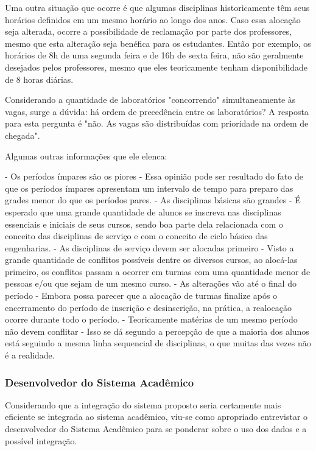         Uma outra situação que ocorre é que algumas disciplinas historicamente têm seus horários definidos em um mesmo horário ao longo dos anos. Caso essa alocação seja alterada, ocorre a possibilidade de reclamação por parte dos professores, mesmo que esta alteração seja benéfica para os estudantes. Então por exemplo, os horários de 8h de uma segunda feira e de 16h de sexta feira, não são geralmente desejados pelos professores, mesmo que eles teoricamente tenham disponibilidade de 8 horas diárias.

        Considerando a quantidade de laboratórios "concorrendo" simultaneamente às vagas, surge a dúvida: há ordem de precedência entre os laboratórios? A resposta para esta pergunta é "não. As vagas são distribuídas com prioridade na ordem de chegada".

        Algumas outras informações que ele elenca:

        - Os períodos ímpares são os piores
        - Essa opinião pode ser resultado do fato de que os períodos ímpares apresentam um intervalo de tempo para preparo das grades menor do que os períodos pares.
        - As disciplinas básicas são grandes
        - É esperado que uma grande quantidade de alunos se inscreva nas disciplinas essenciais e iniciais de seus cursos, sendo boa parte dela relacionada com o conceito das disciplinas de serviço e com o conceito de ciclo básico das engenharias.
        - As disciplinas de serviço devem ser alocadas primeiro
        - Visto a grande quantidade de conflitos possíveis dentre os diversos cursos, ao alocá-las primeiro, os conflitos passam a ocorrer em turmas com uma quantidade menor de pessoas e/ou que sejam de um mesmo curso.
        - As alterações vão até o final do período
        - Embora possa parecer que a alocação de turmas finalize após o encerramento do período de inscrição e desinscrição, na prática, a realocação ocorre durante todo o período.
        - Teoricamente matérias de um mesmo período não devem conflitar
        - Isso se dá segundo a percepção de que a maioria dos alunos está seguindo a mesma linha sequencial de disciplinas, o que muitas das vezes não é a realidade.

    \subsubsection{Desenvolvedor do Sistema Acadêmico} %

        Considerando que a integração do sistema proposto seria certamente mais eficiente se integrada ao sistema acadêmico, viu-se como apropriado entrevistar o desenvolvedor do Sistema Acadêmico para se ponderar sobre o uso dos dados e a possível integração.

